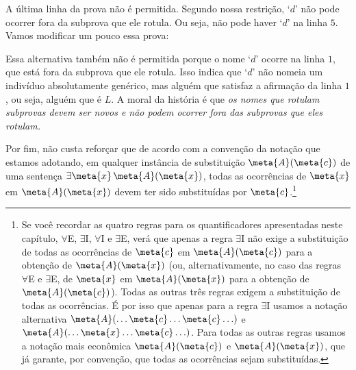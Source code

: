 \begin{fitchproof}
	\open	
	\close
\end{fitchproof}
A última linha da prova não é permitida. Segundo nossa restrição, `$d$' não pode ocorrer fora da subprova que ele rotula. Ou seja, não pode haver `$d$' na linha $5$.
Vamos modificar um pouco essa prova:
\begin{fitchproof}
	\open	
	\close
\end{fitchproof}
Essa alternativa também não é permitida porque o nome `$d$' ocorre na linha $1$, que está fora da subprova que ele rotula.
Isso indica que `$d$' não nomeia um indivíduo absolutamente genérico, mas alguém que satisfaz a afirmação da linha $1$, ou seja, alguém que é $L$.
A moral  da história é que \emph{os nomes que rotulam subprovas devem ser novos e não podem ocorrer fora das subprovas que eles rotulam.}

Por fim, não custa reforçar que de acordo com a convenção da notação que estamos adotando, em qualquer instância de substituição $\meta{A}(\meta{c})$ de uma sentença $\exists \meta{x}\,\meta{A}(\meta{x})$, todas as ocorrências de $\meta{x}$ em $\meta{A}(\meta{x})$ devem ter sido substituídas por $\meta{c}$.\footnote{
	Se você recordar as quatro regras para os quantificadores apresentadas neste capítulo, $\forall$E, $\exists$I, $\forall$I e $\exists$E, verá que apenas a regra $\exists$I não exige a substituição de todas as ocorrências de $\meta{c}$ em $\meta{A}(\meta{c})$ para a obtenção de $\meta{A}(\meta{x})$ (ou, alternativamente, no caso das regras $\forall$E e $\exists$E, de $\meta{x}$ em $\meta{A}(\meta{x})$ para a obtenção de $\meta{A}(\meta{c})$). Todas as outras três regras exigem a substituição de todas as ocorrências. É por isso que apenas para a regra $\exists$I usamos a notação alternativa $\meta{A}(\ldots\meta{c}\ldots\meta{c}\ldots)$ e $\meta{A}(\ldots \meta{x} \ldots \meta{c}\ldots)$. Para todas as outras regras usamos a notação mais econômica $\meta{A}(\meta{c})$ e $\meta{A}(\meta{x})$, que já garante, por convenção, que todas as ocorrências sejam substituídas.}


